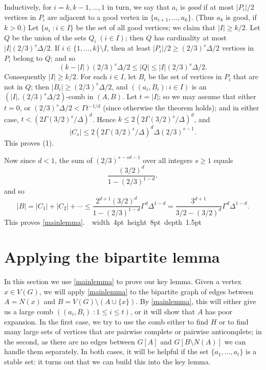\documentclass[titlepage,11pt]{article}
\newcommand\blackslug{\hbox{\hskip 1pt \vrule width 4pt height 8pt depth 1.5pt
        \hskip 1pt}}
\newcommand\bbox{\hfill \quad \blackslug \bigbreak}
\def\ll{,\ldots,}
\begin{document}
Inductively, for $i=k, k-1\ll 1$ in turn, we say that $a_i$ is {\em good} if at most
$|P_i|/2$ vertices in $P_i$ are adjacent to a good vertex in $\{a_{i+1}\ll a_k\}$. (Thus $a_k$ is good, if $k>0$.) 
Let $\{a_i\;:i\in I\}$ 
be the set of all good vertices; we claim
that $|I|\ge k/2$. Let $Q$ be the union of the sets $Q_i\;(i\in I)$; then $Q$ has cardinality at most 
$|I|(2/3)^{s}\Delta/2$.
If $i\in \{1\ll k\}\setminus I$, then at least $|P_i|/2\ge (2/3)^{s}\Delta/2$ vertices in $P_i$ belong to $Q$; and so 
$$(k-|I|) (2/3)^{s}\Delta/2\le |Q|\le |I|(2/3)^{s}\Delta/2.$$
Consequently $|I|\ge k/2$.
For each $i\in I$, let $B_i$ be the set of vertices in $P_i$ that are not in $Q$; then $|B_i|\ge  (2/3)^{s}\Delta/2$,
and $((a_i,B_i):i\in I)$ is an $(|I|, (2/3)^{s}\Delta/2)$-comb in $(A,B)$. Let $t=|I|$; so we may assume that either $t=0$, or
$(2/3)^{s}\Delta/2<\Gamma t^{-1/d}$ (since otherwise the theorem holds); and in either case,
$t< (2\Gamma (3/2)^{s}/\Delta)^{d}$. Hence $k\le 2(2\Gamma (3/2)^{s}/\Delta)^{d}$, and 
$$|C_s|\le 2(2\Gamma (3/2)^{s}/\Delta)^{d}\Delta (2/3)^{s-1}.$$
This proves (1).

\bigskip
Now since $d<1$, the sum of $(2/3)^{s-sd-1}$ over all integers $s\ge 1$ equals
$$\frac{(3/2)^{d}}{1-(2/3)^{1-d}},$$
and so 
$$|B|=|C_1|+|C_2|+\cdots \le \frac{2^{d+1}(3/2)^{d}}{1-(2/3)^{1-d}}\Gamma^d \Delta^{1-d}=\frac{3^{d+1}}{3/2-(3/2)^{d}}\Gamma^d\Delta^{1-d}.$$
This proves \ref{mainlemma}.~\bbox




\section{Applying the bipartite lemma}

In this section we use \ref{mainlemma} to prove our key lemma.  Given a vertex $x\in V(G)$, we will apply \ref{mainlemma} to the bipartite graph of edges between $A=N(x)$ and $B=V(G)\setminus(A\cup\{x\})$.  By \ref{mainlemma}, this will either give us a large comb  $((a_i,B_i)\;:1\le i\le t)$, or it will show that $A$ has poor expansion.  In the first case, we try to use the comb either to find $H$ or to find many large sets of vertices that are pairwise complete or pairwise anticomplete; in the second, as there are no edges between $G[A]$ and $G[B\setminus N(A)]$ we can handle them separately.   In both cases, it will be helpful if the set $\{a_1,\dots,a_t\}$ is a stable set: it turns out that we can build this into the key lemma.
\end{document}
